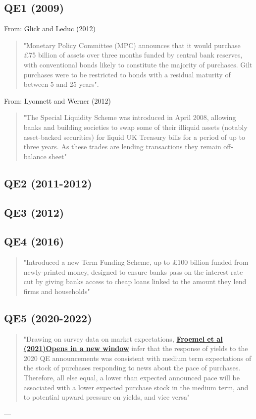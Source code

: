 \subsection{QE1 (2009)}
From: Glick and Leduc (2012)
\begin{quote}
"Monetary Policy Committee (MPC) announces that it would purchase £75 billion of assets over three months funded by central bank reserves, with conventional bonds likely to constitute the majority of purchases. Gilt purchases were to be restricted to bonds with a residual maturity of between 5 and 25 years".
\end{quote}
From: Lyonnett and Werner (2012)
\begin{quote}
"The Special Liquidity Scheme was introduced in April 2008, allowing banks and building societies to swap some of their illiquid assets (notably asset-backed securities) for liquid UK Treasury bills for a period of up to three years. As these trades are lending transactions they remain off-balance sheet"
\end{quote}
\subsection{QE2 (2011-2012)}

\subsection{QE3 (2012)}

\subsection{QE4 (2016)}
\begin{quote}
"Introduced a new Term Funding Scheme, up to £100 billion funded from newly-printed money, designed to ensure banks pass on the interest rate cut by giving banks access to cheap loans linked to the amount they lend firms and households"
\end{quote}
\subsection{QE5 (2020-2022)}
\begin{quote}
"Drawing on survey data on market expectations, \href{https://bankunderground.co.uk/2021/03/26/what-to-expect-when-theyre-expecting/}{\textbf{Froemel et al (2021)Opens in a new window}} infer that the response of yields to the 2020 QE announcements was consistent with medium term expectations of the stock of purchases responding to news about the pace of purchases. Therefore, all else equal, a lower than expected announced pace will be associated with a lower expected purchase stock in the medium term, and to potential upward pressure on yields, and vice versa"
\end{quote}
---
